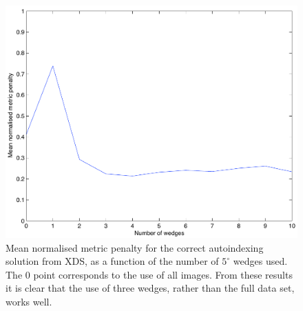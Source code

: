 \documentclass[a4paper, 11pt]{article}
\begin{document}
\begin{figure}
\caption{Mean normalised metric penalty for the correct autoindexing 
solution from XDS, as a function of the number of $5^{\circ}$ wedges used.
The 0 point corresponds to the use of all images. From these results it is
clear that the use of three wedges, rather than the full data set, works
well.
\label{figure:xds_n_images}}
\centering
\includegraphics[scale=0.5]{figures/xds_n_wedges.pdf}
\end{figure}
\end{document}
